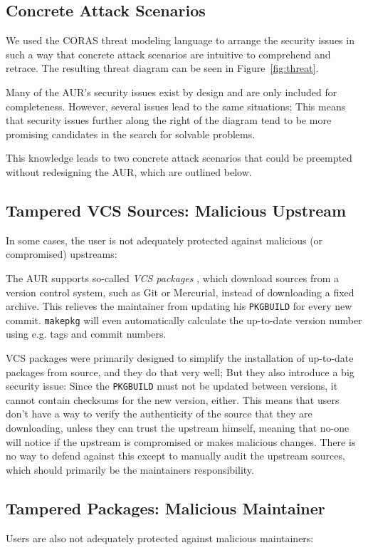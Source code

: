 \subsection*{Concrete Attack Scenarios}
We used the CORAS \cite{Dahl:2007} threat modeling language to arrange the security issues in such a way that concrete attack scenarios are intuitive to comprehend and retrace. The resulting threat diagram can be seen in Figure~\ref{fig:threat}.

Many of the AUR's security issues exist by design and are only included for completeness. However, several issues lead to the same situations; This means that security issues further along the right of the diagram tend to be more promising candidates in the search for solvable problems.

This knowledge leads to two concrete attack scenarios that could be preempted without redesigning the AUR, which are outlined below.

\subsection*{Tampered VCS Sources: Malicious Upstream}
In some cases, the user is not adequately protected against malicious (or compromised) upstreams:

The AUR supports so-called \emph{VCS packages} \cite{wiki:VCSPackages}, which download sources from a version control system, such as Git or Mercurial, instead of downloading a fixed archive. This relieves the maintainer from updating his \texttt{PKGBUILD} for every new commit.
\texttt{makepkg} will even automatically calculate the up-to-date version number using e.g. tags and commit numbers.

VCS packages were primarily designed to simplify the installation of up-to-date packages from source, and they do that very well; But they also introduce a big security issue:
Since the \texttt{PKGBUILD} must not be updated between versions, it cannot contain checksums for the new version, either.
This means that users don't have a way to verify the authenticity of the source that they are downloading, unless they can trust the upstream himself, meaning that no-one will notice if the upstream is compromised or makes malicious changes. There is no way to defend against this except to manually audit the upstream sources, which should primarily be the maintainers responsibility.

\subsection*{Tampered Packages: Malicious Maintainer}
Users are also not adequately protected against malicious maintainers:

